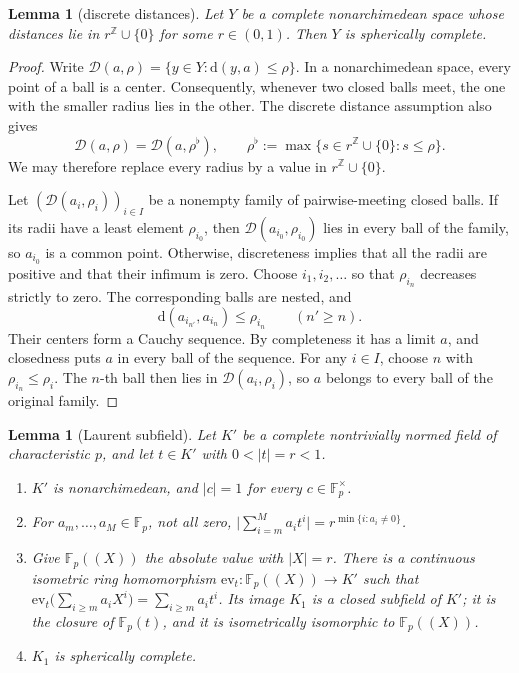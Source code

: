 \documentclass[11pt]{amsart}
\newtheorem{lemma}[theorem]{Lemma}
\theoremstyle{definition}
\theoremstyle{remark}
\numberwithin{equation}{section}
\newcommand{\Z}{\mathbb Z}
\newcommand{\F}{\mathbb F}
\newcommand{\abs}[1]{\lvert #1\rvert}
\newcommand{\cD}{\mathcal{D}}
\theoremstyle{plain}
\theoremstyle{definition}
\theoremstyle{plain}
\begin{document}
\begin{lemma}[discrete distances]\label{lem:discdist}
Let $Y$ be a complete nonarchimedean space whose distances lie in $r^\Z\cup\{0\}$ for some $r\in(0,1)$. Then $Y$ is
spherically complete.
\end{lemma}

\begin{proof}
Write $\cD(a,\rho)=\{y\in Y:\mathrm d(y,a)\le\rho\}$. In a nonarchimedean space, every point of a ball is a center.
Consequently, whenever two closed balls meet, the one with the smaller radius lies in the other.
The discrete distance assumption also gives
\[
\cD(a,\rho)=\cD(a,\rho^\flat),\qquad
\rho^\flat:=\max\{s\in r^\Z\cup\{0\}:s\le\rho\}.
\]
We may therefore replace every radius by a value in $r^\Z\cup\{0\}$.

Let $(\cD(a_i,\rho_i))_{i\in I}$ be a nonempty family of pairwise-meeting closed balls. If its radii have a least
element $\rho_{i_0}$, then $\cD(a_{i_0},\rho_{i_0})$ lies in every ball of the family, so $a_{i_0}$ is a common point.
Otherwise, discreteness implies that all the radii are positive and that their infimum is zero. Choose
$i_1,i_2,\dots$ so that $\rho_{i_n}$ decreases strictly to zero. The corresponding balls are nested, and
\[
\mathrm d(a_{i_{n'}},a_{i_n})\le\rho_{i_n}\qquad(n'\ge n).
\]
Their centers form a Cauchy sequence. By completeness it has a limit $a$, and closedness puts $a$ in every ball
of the sequence. For any $i\in I$, choose $n$ with $\rho_{i_n}\le\rho_i$. The $n$\nobreakdash-th ball then lies in
$\cD(a_i,\rho_i)$, so $a$ belongs to every ball of the original family.
\end{proof}



\begin{lemma}[Laurent subfield]\label{lem:laurentsub}
Let $K'$ be a complete nontrivially normed field of characteristic $p$, and let $t\in K'$ with $0<\abs t=r<1$.
\begin{enumerate}
\item $K'$ is nonarchimedean, and $\abs c=1$ for every $c\in\F_p^\times$.
\item For $a_m,\dots,a_M\in\F_p$, not all zero, $\bigl\lvert\sum_{i=m}^Ma_it^i\bigr\rvert=r^{\min\{i:a_i\ne0\}}$.
\item Give $\F_p((X))$ the absolute value with $\abs X=r$. There is a continuous isometric ring homomorphism
$\mathrm{ev}_t\colon\F_p((X))\to K'$ such that
$\mathrm{ev}_t\bigl(\sum_{i\ge m}a_iX^i\bigr)=\sum_{i\ge m}a_it^i$. Its image
$K_1$ is a closed subfield of $K'$; it is the closure of $\F_p(t)$, and it is isometrically isomorphic to $\F_p((X))$.
\item $K_1$ is spherically complete.
\end{enumerate}
\end{lemma}
\end{document}
